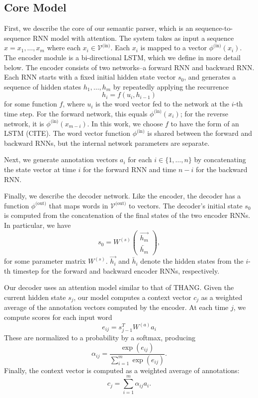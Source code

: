 \documentclass[11pt,letterpaper]{article}
\newcommand{\vocabin}{\mathcal{V}^{\text{(in)}}}
\newcommand{\phiin}{\phi^{\text{(in)}}}
\newcommand{\vocabout}{\mathcal{V}^{\text{(out)}}}
\newcommand{\phiout}{\phi^{\text{(out)}}}
\begin{document}
\subsection{Core Model} 
First, we describe the core of our semantic parser,
which is an sequence-to-sequence RNN model with attention.
The system takes as input a sequence $x = x_1 ,\dotsc , x_m$
where each $x_i \in \vocabin$.
Each $x_i$ is mapped to a vector $\phiin(x_i)$.
The encoder module is a bi-directional LSTM, which we define
in more detail below.
The encoder consists of two networks--a forward RNN and backward RNN.
Each RNN starts with a fixed initial hidden state vector $s_0$, and 
generates a sequence of hidden states $h_1, \dotsc, h_m$ by
repeatedly applying the recurrence \[
  h_i = f(u_i, h_{i-1})
\]
for some function $f$,
where $u_i$ is the word vector fed to the network at the $i$-th time step.
For the forward network, this equals $\phiin(x_i)$; for the
reverse network, it is $\phiin(x_{m-i})$.
In this work, we choose $f$ to have the form of an LSTM (CITE).
The word vector function $\phiin$ is shared between the 
forward and backward RNNs, but the internal network parameters are
separate.

Next, we generate annotation vectors $a_i$ for each 
$i \in \{1, \dotsc, n\}$ by concatenating the 
state vector at time $i$ for the forward RNN and time $n-i$ 
for the backward RNN.

Finally, we describe the decoder network.  
Like the encoder, the decoder has a function $\phiout$
that maps words in $\vocabout$ to vectors.
The decoder's initial state $s_0$ is computed from 
the concatenation of the final states of the two encoder RNNs.
In particular, we have \[
  s_0 = W^{(s)} \begin{pmatrix} \overrightarrow{h_m} \\ \overleftarrow{h_m} \end{pmatrix},
\]
for some parameter matrix $W^{(s)}$.
$\overrightarrow{h_i}$ and $\overleftarrow{h_i}$ denote the hidden states
from the $i$-th timestep for the forward and backward encoder RNNs, respectively.

Our decoder uses an attention model similar to that of THANG.
Given the current hidden state $s_j$, our model computes
a context vector $c_j$ as a weighted average of the annotation vectors
computed by the encoder.
At each time $j$, we compute scores for each input word \[
  e_{ij} = s_{j-1}^T W^{(a)} a_i
\]
These are normalized to a probability by a softmax, producing \[
  \alpha_{ij} = \frac{\exp(e_{ij})}{\sum_{i=1}^m \exp(e_{ij})}.
\]
Finally, the context vector is computed as a weighted average of annotations: \[
  c_j = \sum_{i=1}^m \alpha_{ij} a_i.
\]
\end{document}
